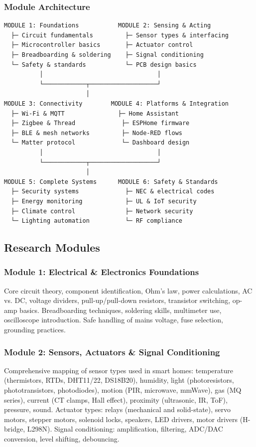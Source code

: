 \documentclass[11pt,letterpaper]{article}
\begin{document}
\subsubsection{Module Architecture}

\begin{asciibox}
\begin{verbatim}
MODULE 1: Foundations           MODULE 2: Sensing & Acting
  ├─ Circuit fundamentals         ├─ Sensor types & interfacing
  ├─ Microcontroller basics       ├─ Actuator control
  ├─ Breadboarding & soldering    ├─ Signal conditioning
  └─ Safety & standards           └─ PCB design basics
          │                                │
          └────────────┬───────────────────┘
                       │
MODULE 3: Connectivity        MODULE 4: Platforms & Integration
  ├─ Wi-Fi & MQTT               ├─ Home Assistant
  ├─ Zigbee & Thread             ├─ ESPHome firmware
  ├─ BLE & mesh networks         ├─ Node-RED flows
  └─ Matter protocol             └─ Dashboard design
          │                                │
          └────────────┬───────────────────┘
                       │
MODULE 5: Complete Systems      MODULE 6: Safety & Standards
  ├─ Security systems             ├─ NEC & electrical codes
  ├─ Energy monitoring            ├─ UL & IoT security
  ├─ Climate control              ├─ Network security
  └─ Lighting automation          └─ RF compliance
\end{verbatim}
\end{asciibox}

\subsection{Research Modules}

\subsubsection{Module 1: Electrical \& Electronics Foundations}
Core circuit theory, component identification, Ohm's law, power calculations, AC vs. DC, voltage dividers, pull-up/pull-down resistors, transistor switching, op-amp basics. Breadboarding techniques, soldering skills, multimeter use, oscilloscope introduction. Safe handling of mains voltage, fuse selection, grounding practices.

\subsubsection{Module 2: Sensors, Actuators \& Signal Conditioning}
Comprehensive mapping of sensor types used in smart homes: temperature (thermistors, RTDs, DHT11/22, DS18B20), humidity, light (photoresistors, phototransistors, photodiodes), motion (PIR, microwave, mmWave), gas (MQ series), current (CT clamps, Hall effect), proximity (ultrasonic, IR, ToF), pressure, sound. Actuator types: relays (mechanical and solid-state), servo motors, stepper motors, solenoid locks, speakers, LED drivers, motor drivers (H-bridge, L298N). Signal conditioning: amplification, filtering, ADC/DAC conversion, level shifting, debouncing.
\end{document}
